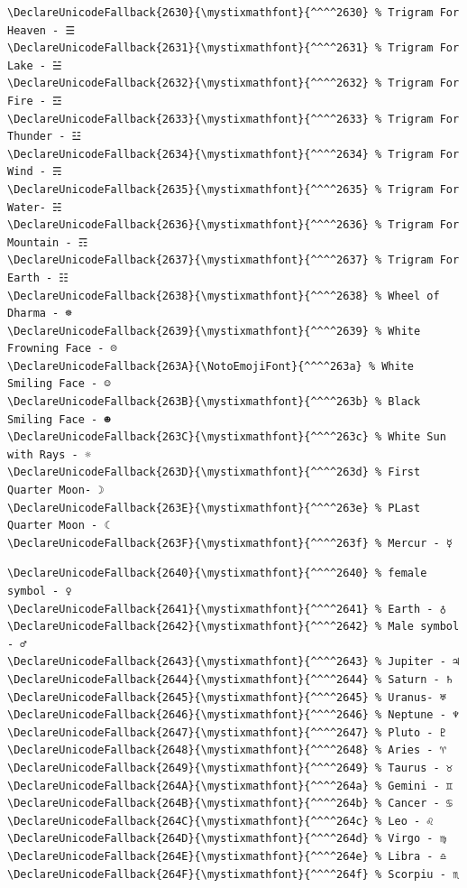 \documentclass[12pt, twoside]{article}
\begin{document}
\newpage
\begin{verbatim}
\DeclareUnicodeFallback{2630}{\mystixmathfont}{^^^^2630} % Trigram For Heaven - ☰
\DeclareUnicodeFallback{2631}{\mystixmathfont}{^^^^2631} % Trigram For Lake - ☱
\DeclareUnicodeFallback{2632}{\mystixmathfont}{^^^^2632} % Trigram For Fire - ☲
\DeclareUnicodeFallback{2633}{\mystixmathfont}{^^^^2633} % Trigram For Thunder - ☳
\DeclareUnicodeFallback{2634}{\mystixmathfont}{^^^^2634} % Trigram For Wind - ☴
\DeclareUnicodeFallback{2635}{\mystixmathfont}{^^^^2635} % Trigram For Water- ☵
\DeclareUnicodeFallback{2636}{\mystixmathfont}{^^^^2636} % Trigram For Mountain - ☶
\DeclareUnicodeFallback{2637}{\mystixmathfont}{^^^^2637} % Trigram For Earth - ☷
\DeclareUnicodeFallback{2638}{\mystixmathfont}{^^^^2638} % Wheel of Dharma - ☸
\DeclareUnicodeFallback{2639}{\mystixmathfont}{^^^^2639} % White Frowning Face - ☹
\DeclareUnicodeFallback{263A}{\NotoEmojiFont}{^^^^263a} % White Smiling Face - ☺
\DeclareUnicodeFallback{263B}{\mystixmathfont}{^^^^263b} % Black Smiling Face - ☻
\DeclareUnicodeFallback{263C}{\mystixmathfont}{^^^^263c} % White Sun with Rays - ☼
\DeclareUnicodeFallback{263D}{\mystixmathfont}{^^^^263d} % First Quarter Moon- ☽
\DeclareUnicodeFallback{263E}{\mystixmathfont}{^^^^263e} % PLast Quarter Moon - ☾
\DeclareUnicodeFallback{263F}{\mystixmathfont}{^^^^263f} % Mercur - ☿

\end{verbatim}
\newpage
\begin{verbatim}
\DeclareUnicodeFallback{2640}{\mystixmathfont}{^^^^2640} % female symbol - ♀
\DeclareUnicodeFallback{2641}{\mystixmathfont}{^^^^2641} % Earth - ♁
\DeclareUnicodeFallback{2642}{\mystixmathfont}{^^^^2642} % Male symbol - ♂
\DeclareUnicodeFallback{2643}{\mystixmathfont}{^^^^2643} % Jupiter - ♃
\DeclareUnicodeFallback{2644}{\mystixmathfont}{^^^^2644} % Saturn - ♄
\DeclareUnicodeFallback{2645}{\mystixmathfont}{^^^^2645} % Uranus- ♅
\DeclareUnicodeFallback{2646}{\mystixmathfont}{^^^^2646} % Neptune - ♆
\DeclareUnicodeFallback{2647}{\mystixmathfont}{^^^^2647} % Pluto - ♇
\DeclareUnicodeFallback{2648}{\mystixmathfont}{^^^^2648} % Aries - ♈
\DeclareUnicodeFallback{2649}{\mystixmathfont}{^^^^2649} % Taurus - ♉
\DeclareUnicodeFallback{264A}{\mystixmathfont}{^^^^264a} % Gemini - ♊
\DeclareUnicodeFallback{264B}{\mystixmathfont}{^^^^264b} % Cancer - ♋
\DeclareUnicodeFallback{264C}{\mystixmathfont}{^^^^264c} % Leo - ♌
\DeclareUnicodeFallback{264D}{\mystixmathfont}{^^^^264d} % Virgo - ♍
\DeclareUnicodeFallback{264E}{\mystixmathfont}{^^^^264e} % Libra - ♎
\DeclareUnicodeFallback{264F}{\mystixmathfont}{^^^^264f} % Scorpiu - ♏

\end{verbatim}
\end{document}

